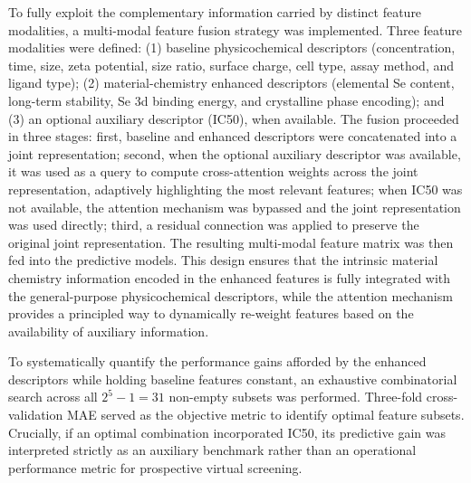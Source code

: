 To fully exploit the complementary information carried by distinct feature modalities, a multi-modal feature fusion strategy was implemented. Three feature modalities were defined: (1) baseline physicochemical descriptors (concentration, time, size, zeta potential, size ratio, surface charge, cell type, assay method, and ligand type); (2) material-chemistry enhanced descriptors (elemental Se content, long-term stability, Se 3d binding energy, and crystalline phase encoding); and (3) an optional auxiliary descriptor (IC50), when available. The fusion proceeded in three stages: first, baseline and enhanced descriptors were concatenated into a joint representation; second, when the optional auxiliary descriptor was available, it was used as a query to compute cross-attention weights across the joint representation, adaptively highlighting the most relevant features; when IC50 was not available, the attention mechanism was bypassed and the joint representation was used directly; third, a residual connection was applied to preserve the original joint representation. The resulting multi-modal feature matrix was then fed into the predictive models. This design ensures that the intrinsic material chemistry information encoded in the enhanced features is fully integrated with the general-purpose physicochemical descriptors, while the attention mechanism provides a principled way to dynamically re-weight features based on the availability of auxiliary information.

To systematically quantify the performance gains afforded by the enhanced descriptors while holding baseline features constant, an exhaustive combinatorial search across all $2^5 - 1 = 31$ non-empty subsets was performed. Three-fold cross-validation MAE served as the objective metric to identify optimal feature subsets. Crucially, if an optimal combination incorporated IC50, its predictive gain was interpreted strictly as an auxiliary benchmark rather than an operational performance metric for prospective virtual screening.

